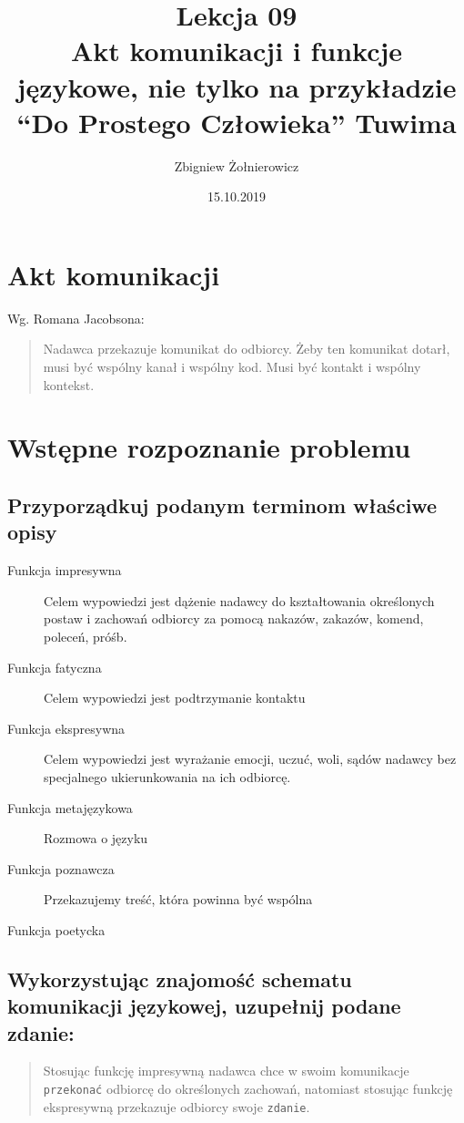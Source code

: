 \documentclass[a4paper]{article}
\begin{document}
\title{{\huge Lekcja 09} \\
{\large Akt komunikacji i funkcje językowe, nie tylko na przykładzie ``Do Prostego Człowieka'' Tuwima}}
\author{Zbigniew Żołnierowicz}
\date{15.10.2019}
\maketitle
\section*{Akt komunikacji}
Wg. Romana Jacobsona:
\begin{quote}
    Nadawca przekazuje komunikat do odbiorcy. Żeby ten komunikat dotarł, musi być wspólny kanał i wspólny kod. Musi być kontakt i wspólny kontekst.
\end{quote}
\section{Wstępne rozpoznanie problemu}
\subsection{Przyporządkuj podanym terminom właściwe opisy}
    \begin{description}
        \item[Funkcja impresywna] Celem wypowiedzi jest dążenie nadawcy do kształtowania określonych postaw i zachowań odbiorcy za pomocą nakazów, zakazów, komend, poleceń, próśb.
        \item[Funkcja fatyczna] Celem wypowiedzi jest podtrzymanie kontaktu
        \item[Funkcja ekspresywna] Celem wypowiedzi jest wyrażanie emocji, uczuć, woli, sądów nadawcy bez specjalnego ukierunkowania na ich odbiorcę.
        \item[Funkcja metajęzykowa] Rozmowa o języku
        \item[Funkcja poznawcza] Przekazujemy treść, która powinna być wspólna
        \item[Funkcja poetycka] 
    \end{description}
\subsection{Wykorzystując znajomość schematu komunikacji języ\-kowej, uzupełnij podane zdanie:}
\begin{quote}
    Stosując funkcję impresywną nadawca chce w swoim komunikacje {\tt przekonać} odbiorcę do określonych zachowań, natomiast stosując funkcję ekspresywną przekazuje odbiorcy swoje {\tt zdanie}.
\end{quote}
\end{document}
